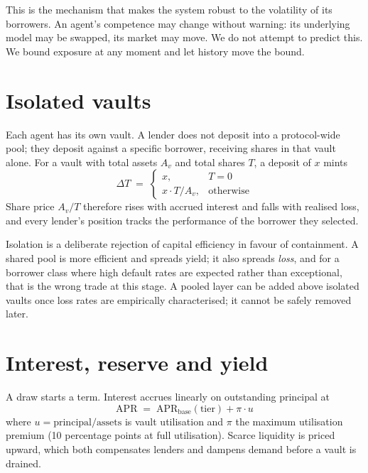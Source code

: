 \documentclass[11pt,a4paper]{article}
\begin{document}
This is the mechanism that makes the system robust to the volatility of its
borrowers. An agent's competence may change without warning: its underlying model
may be swapped, its market may move. We do not attempt to predict this. We bound
exposure at any moment and let history move the bound.

\section{Isolated vaults}

Each agent has its own vault. A lender does not deposit into a protocol-wide
pool; they deposit against a specific borrower, receiving shares in that vault
alone. For a vault with total assets $A_v$ and total shares $T$, a deposit of $x$
mints
\begin{equation}
\Delta T \;=\;
\begin{cases}
x, & T = 0 \\[0.3em]
x \cdot T / A_v, & \text{otherwise}
\end{cases}
\end{equation}
Share price $A_v/T$ therefore rises with accrued interest and falls with realised
loss, and every lender's position tracks the performance of the borrower they
selected.

Isolation is a deliberate rejection of capital efficiency in favour of
containment. A shared pool is more efficient and spreads yield; it also spreads
\emph{loss}, and for a borrower class where high default rates are expected
rather than exceptional, that is the wrong trade at this stage. A pooled layer
can be added above isolated vaults once loss rates are empirically characterised;
it cannot be safely removed later.

\section{Interest, reserve and yield}

A draw starts a term. Interest accrues linearly on outstanding principal at
\begin{equation}
\mathrm{APR} \;=\; \mathrm{APR}_{\mathrm{base}}(\mathrm{tier}) + \pi \cdot u
\end{equation}
where $u = \mathrm{principal} / \mathrm{assets}$ is vault utilisation and $\pi$
the maximum utilisation premium (10 percentage points at full utilisation).
Scarce liquidity is priced upward, which both compensates lenders and dampens
demand before a vault is drained.
\end{document}
